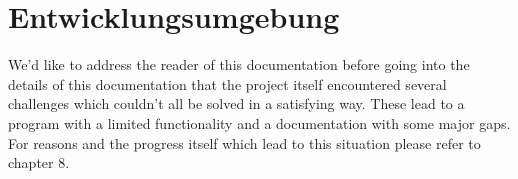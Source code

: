 \section{Entwicklungsumgebung}
\label{sec:Entwicklungsumgebung}

We'd like to address the reader of this documentation before going into the details of this documentation that the project itself encountered several challenges which couldn't all be solved in a satisfying way. These lead to a program with a limited functionality and a documentation with some major gaps. For reasons and the progress itself which lead to this situation please refer to chapter 8.